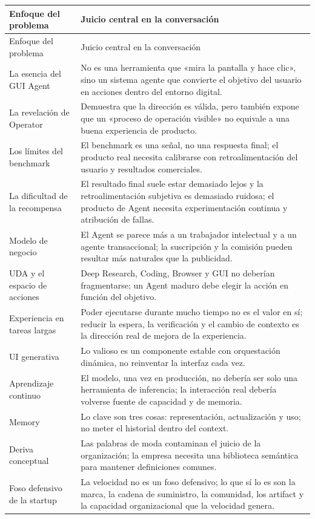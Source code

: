 \documentclass[a4paper]{article}
\begin{document}
\begin{longtable}{>{\raggedright\arraybackslash}p{} >{\raggedright\arraybackslash}p{}}
\toprule
Enfoque del problema & Juicio central en la conversación \\
\midrule
\endfirsthead
\toprule
Enfoque del problema & Juicio central en la conversación \\
\midrule
\endhead
La esencia del GUI Agent & No es una herramienta que «mira la pantalla y hace clic», sino un sistema agente que convierte el objetivo del usuario en acciones dentro del entorno digital. \\
La revelación de Operator & Demuestra que la dirección es válida, pero también expone que un «proceso de operación visible» no equivale a una buena experiencia de producto. \\
Los límites del benchmark & El benchmark es una señal, no una respuesta final; el producto real necesita calibrarse con retroalimentación del usuario y resultados comerciales. \\
La dificultad de la recompensa & El resultado final suele estar demasiado lejos y la retroalimentación subjetiva es demasiado ruidosa; el producto de Agent necesita experimentación continua y atribución de fallas. \\
Modelo de negocio & El Agent se parece más a un trabajador intelectual y a un agente transaccional; la suscripción y la comisión pueden resultar más naturales que la publicidad. \\
UDA y el espacio de acciones & Deep Research, Coding, Browser y GUI no deberían fragmentarse; un Agent maduro debe elegir la acción en función del objetivo. \\
Experiencia en tareas largas & Poder ejecutarse durante mucho tiempo no es el valor en sí; reducir la espera, la verificación y el cambio de contexto es la dirección real de mejora de la experiencia. \\
UI generativa & Lo valioso es un componente estable con orquestación dinámica, no reinventar la interfaz cada vez. \\
Aprendizaje continuo & El modelo, una vez en producción, no debería ser solo una herramienta de inferencia; la interacción real debería volverse fuente de capacidad y de memoria. \\
Memory & Lo clave son tres cosas: representación, actualización y uso; no meter el historial dentro del context. \\
Deriva conceptual & Las palabras de moda contaminan el juicio de la organización; la empresa necesita una biblioteca semántica para mantener definiciones comunes. \\
Foso defensivo de la startup & La velocidad no es un foso defensivo; lo que sí lo es son la marca, la cadena de suministro, la comunidad, los artifact y la capacidad organizacional que la velocidad genera. \\
\bottomrule
\end{longtable}
\end{document}
